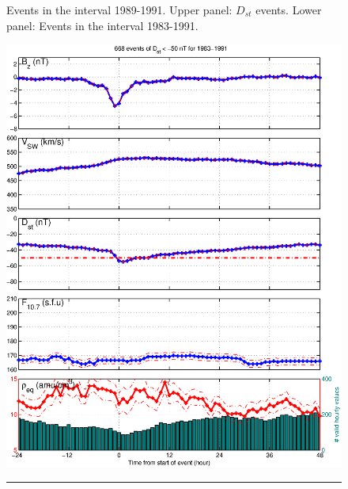 \documentclass[10pt,twocolumn]{article}
\begin{document}
\begin{figure}[tp!]
\caption{Events in the interval 1989-1991. Upper panel: $D_{st}$ events. Lower panel: Events in the interval 1983-1991.}
\label{DailyAverages}
\end{figure}

\begin{figure}[tp!]
\centering
\includegraphics[scale=0.40]{paperfigures/stormavs-dst.eps}
\rule[1ex]{5cm}{1pt}

\end{figure}
\end{document}
